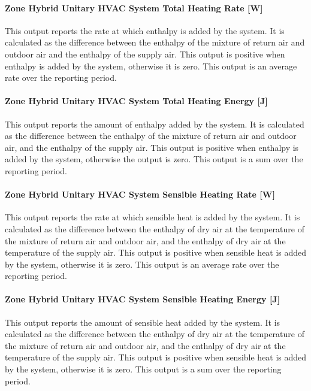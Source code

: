 \paragraph{Zone Hybrid Unitary HVAC System Total Heating Rate [W]}
This output reports the rate at which enthalpy is added by the system. It is calculated as the difference between the enthalpy of the mixture of return air and outdoor air and the enthalpy of the supply air. This output is positive when enthalpy is added by the system, otherwise it is zero. This output is an  average rate over the reporting period.

\paragraph{Zone Hybrid Unitary HVAC System Total Heating Energy [J]}
This output reports the amount of enthalpy added by the system. It is calculated as the difference between the enthalpy of the mixture of return air and outdoor air, and the enthalpy of the supply air. This output is positive when enthalpy is added by the system, otherwise the output is zero.  This output is a sum over the reporting period.

\paragraph{Zone Hybrid Unitary HVAC System Sensible Heating Rate [W]}
This output reports the rate at which sensible heat is added by the system.  It is calculated as the difference between the enthalpy of dry air at the temperature of the mixture of return air and outdoor air, and the enthalpy of dry air at the temperature of the supply air. This output is positive when sensible heat is added by the system, otherwise it is zero.  This output is an average rate over the reporting period.

\paragraph{Zone Hybrid Unitary HVAC System Sensible Heating Energy [J]}
This output reports the amount of sensible heat added by the system. It is calculated as the difference between the enthalpy of dry air at the temperature of the mixture of return air and outdoor air, and the enthalpy of dry air at the temperature of the supply air. This output is positive when sensible heat is added by the system, otherwise it is zero. This output is a sum over the reporting period.

